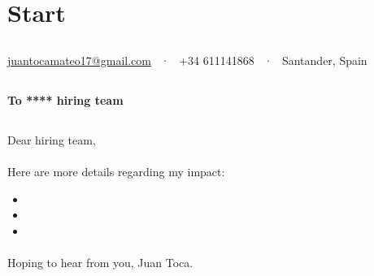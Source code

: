 \documentclass[grey]{hipstercv}
\begin{document}

\section*{Start}




\subsection*{}

\vspace{2em}
\raggedleft
\color{white}
\faEnvelopeO\space\href{mailto:juantocamateo17@gmail.com}{juantocamateo17@gmail.com} ~·~
\faPhone \space +34 611141868 ~·~
\faMapMarker \space Santander, Spain
\newline

\raggedright




\color{black}

\subsection*{}

\textbf{To **** hiring team}

\subsection*{}

Dear hiring team,

\paragraph{}

\lipsum[3-3]

\paragraph{}

\lipsum[3-3]


\paragraph{}

Here are more details regarding my impact:

\begin{itemize}
    \item \lipsum[][1-2]
    \item \lipsum[][2-3]
    \item \lipsum[][3-4]
\end{itemize}

\paragraph{}

\lipsum[4-4]
\newline\newline
Hoping to hear from you,
\newline\newline
Juan Toca.
\end{document}
